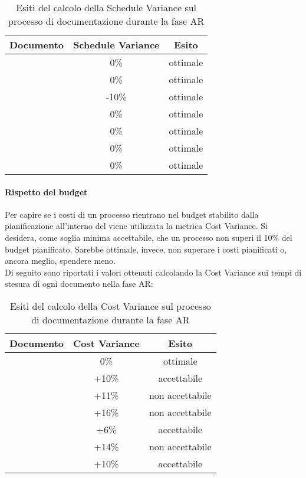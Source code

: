 \documentclass[PianoDiQualifica.tex]{subfiles}
\begin{document}
			\begin{table}[h]
				\centering
				\begin{tabular}{l c c}
					\hline
					\rule[-0.3cm]{0cm}{0.8cm}
					\textbf{Documento} & \textbf{Schedule Variance} & \textbf{Esito} \\
					\hline
					\rule[0cm]{0cm}{0.4cm}
					\PPdocRR & 0\% & ottimale \\
					\rule[0cm]{0cm}{0.4cm}
					\NPdocRR & 0\% & ottimale\\ 
					\rule[0cm]{0cm}{0.4cm}
					\ARdocRR & -10\% & ottimale\\ 
					\rule[0cm]{0cm}{0.4cm}
					\PQdocRR & 0\% & ottimale \\ 
					\rule[0cm]{0cm}{0.4cm}
					\Gldoc & 0\% & ottimale \\ 
					\rule[0cm]{0cm}{0.4cm}
					\SDKdoc & 0\% & ottimale \\ 
					\rule[0cm]{0cm}{0.4cm}
					\SFdocRR & 0\% & ottimale\\ 
					\hline
				\end{tabular}
				\caption{Esiti del calcolo della Schedule Variance sul processo di documentazione durante la fase AR}
			\end{table}
		\paragraph{Rispetto del budget}
		Per capire se i costi di un processo rientrano nel budget stabilito dalla pianificazione all'interno del 				\PPdocRR{} viene utilizzata la metrica Cost Variance. Si desidera, come soglia minima accettabile, che un 				processo non superi il 10\% del budget pianificato. Sarebbe ottimale, invece, non superare i costi pianificati 			o, ancora meglio, spendere meno.\\
		Di seguito sono riportati i valori ottenuti calcolando la Cost Variance sui tempi di stesura di ogni 				documento nella fase AR:\\
\begin{table}[h]
				\centering
				\begin{tabular}{l c c}
					\hline
					\rule[-0.3cm]{0cm}{0.8cm}
					\textbf{Documento} & \textbf{Cost Variance} & \textbf{Esito} \\
					\hline
					\rule[0cm]{0cm}{0.4cm}
					\PPdocRR & 0\% & ottimale \\
					\rule[0cm]{0cm}{0.4cm}
					\NPdocRR & +10\% & accettabile \\ 
					\rule[0cm]{0cm}{0.4cm}
					\ARdocRR & +11\% & non accettabile \\ 
					\rule[0cm]{0cm}{0.4cm}
					\PQdocRR & +16\% & non accettabile \\ 
					\rule[0cm]{0cm}{0.4cm}
					\Gldoc & +6\% & accettabile\\ 
					\rule[0cm]{0cm}{0.4cm}
					\SDKdoc & +14\% & non accettabile \\ 
					\rule[0cm]{0cm}{0.4cm}
					\SFdocRR & +10\% & accettabile\\ 
					\hline
				\end{tabular}
				\caption{Esiti del calcolo della Cost Variance sul processo di documentazione durante la fase AR}
			\end{table}	
			
\end{document}
